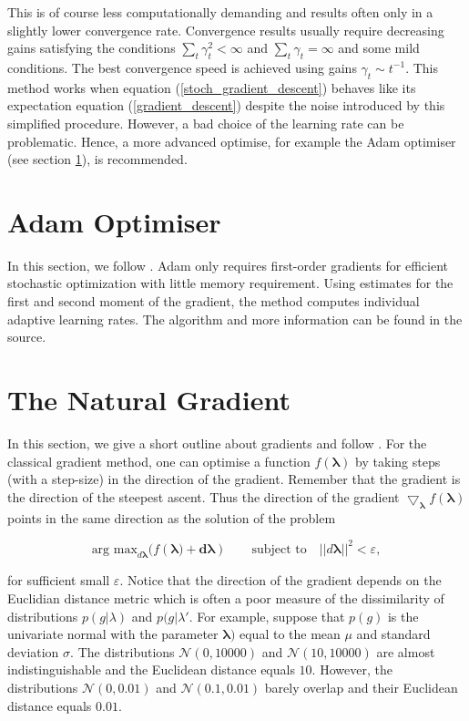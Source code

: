 \documentclass[12pt,a4paper,oneside]{book}
\begin{document}
{This is of course less computationally demanding and results often only in a slightly lower convergence rate. Convergence results usually require decreasing gains satisfying the conditions $\sum\nolimits_t \gamma_t^2 < \infty$ and $\sum\nolimits_t \gamma_t = \infty$ and some mild conditions. The best convergence speed is achieved using gains $\gamma_t \sim t^{-1}$. This method works when equation (\ref{stoch_gradient_descent}) behaves like its expectation equation (\ref{gradient_descent}) despite the noise introduced by this simplified procedure. However, a bad choice of the learning rate can be problematic. Hence, a more advanced optimise, for example the Adam optimiser (see section \ref{appendix_adam}), is recommended. 

\section{Adam Optimiser}\label{appendix_adam}

In this section, we follow \cite{kingma2014adam}. Adam only requires first-order gradients for efficient stochastic optimization with little memory requirement. Using estimates for the first and second moment of the gradient, the method computes individual adaptive learning rates. The algorithm and more information can be found in the source.

\section{The Natural Gradient}\label{appendix_nat_grad}


In this section, we give a short outline about gradients and follow \cite{hoffman2013stochastic}. For the classical gradient method, one can optimise a function $f(\bm{\lambda})$ by taking steps (with a step-size) in the direction of the gradient. Remember that the gradient is the direction of the steepest ascent. Thus the direction of the gradient $\bigtriangledown_{\bm{\lambda}} f(\bm{\lambda})$ points in the same direction as the solution of the problem 

\begin{equation}
\text{arg max}_{d\bm{\lambda}} (f(\bm{\lambda) + d\bm{\lambda}})  \qquad \text{subject to} \quad ||d\bm{\lambda}||^2 < \varepsilon,
\end{equation}

for sufficient small $\varepsilon$. Notice that the direction of the gradient depends on the Euclidian distance metric which is often a poor measure of the dissimilarity of distributions $p(g|\lambda)$ and $p(g|\lambda'$. For example, suppose that $p(g)$ is the univariate normal with the parameter $\bm{\lambda})$ equal to the mean $\mu$ and standard deviation $\sigma$. The distributions $\mathcal{N}(0,10000)$ and $\mathcal{N}(10,10000)$ are almost indistinguishable and the Euclidean distance equals $10$. However, the distributions $\mathcal{N}(0,0.01)$ and $\mathcal{N}(0.1,0.01)$ barely overlap and their Euclidean distance equals $0.01$. 

}
\end{document}
